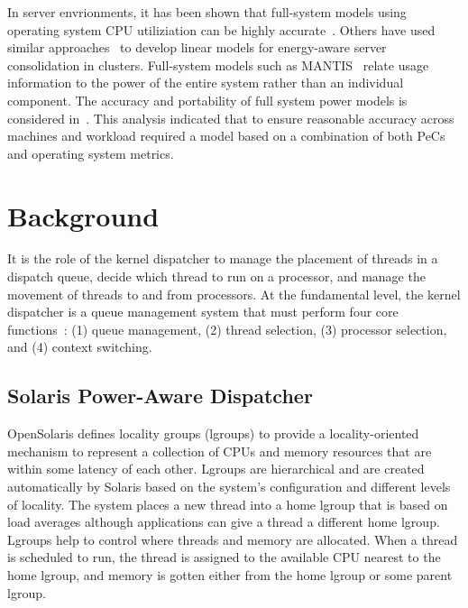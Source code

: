 \documentclass[times,12pt,onecolumn]{article}
\begin{document}
In server envrionments, it has been shown that full-system models
using operating system CPU utiliziation can be highly
accurate~\cite{Fan2007}. Others have used similar
approaches~\cite{Heath2005} to develop linear models for energy-aware
server consolidation in clusters.  Full-system models such as
MANTIS~\cite{Economou2006}\cite{Rivoire2008a} relate usage information
to the power of the entire system rather than an individual component.
The accuracy and portability of full system power models is considered
in~\cite{Rivoire2008b}.  This analysis indicated that to ensure
reasonable accuracy across machines and workload required a model based
on a combination of both PeCs and operating system metrics.
\section{Background}
\label{sec:background}
It is the role of the kernel dispatcher to manage the placement of
threads in a dispatch queue, decide which thread to run on a processor,
and manage the movement of threads to and from processors.   At the
fundamental level, the kernel dispatcher is a queue management system
that must perform four core functions~\cite{McDougall2007}: (1) queue
management, (2) thread selection, (3) processor selection, and (4)
context switching.
\subsection{Solaris Power-Aware Dispatcher}
\label{sec:solpad}
OpenSolaris defines locality groups (lgroups) to provide a
locality-oriented mechanism to represent a collection of CPUs and
memory resources that are within some latency of each other.
Lgroups are hierarchical and are created automatically by Solaris
based on the system’s conﬁguration and different levels of
locality. The system places a new thread into a home lgroup that
is based on load averages although applications can give a thread
a different home lgroup. Lgroups help to control where threads
and memory are allocated.  When a thread is scheduled to run, the
thread is assigned to the available CPU nearest to the home
lgroup, and memory is gotten either from the home lgroup or some
parent lgroup.
\end{document}
